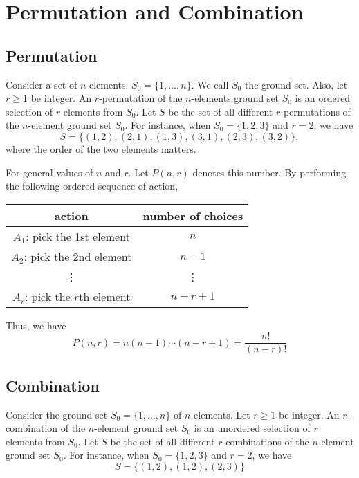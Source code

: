\newpage
\section{Permutation and Combination}
\subsection{Permutation}
\begin{eg}
    Consider a set of \(n\) elements: \(S_0 = \{1, \dots, n\}\). We call \(S_0\) the ground set. Also, let \(r \geq 1\) be integer. An \(r\)-permutation of the \(n\)-elements ground set \(S_0\) is an ordered selection of \(r\) elements from \(S_0\). Let \(S\) be the set of all different \(r\)-permutations of the \(n\)-element ground set \(S_0\). For instance, when \(S_0 = \{1, 2, 3\}\) and \(r = 2\), we have
    \[
        S = \{(1, 2), (2, 1), (1, 3), (3, 1), (2, 3), (3, 2)\},
    \]
    where the order of the two elements matters. 
\end{eg}

For general values of \(n\) and \(r\). Let \(P(n, r)\) denotes this number. By performing the following ordered sequence of action,
\begin{table}[H]
    \centering
    \begin{tabular}{c|c}
            action & number of choices  \\
        \midrule
            \(A_1\): pick the 1st element & \(n\)   \\
            \(A_2\): pick the 2nd element & \(n - 1\)   \\
            \vdots & \vdots  \\
            \(A_r\): pick the \(r\)th element & \(n - r + 1\)
    \end{tabular}
\end{table}
Thus, we have
\[
    P(n, r) = n(n - 1)\cdots(n - r + 1) = \dfrac{n!}{(n - r)!}
\]

\subsection{Combination}
\begin{eg}
    Consider the ground set \(S_0 = \{1, \dots, n\}\) of \(n\) elements. Let \(r \geq 1\) be integer. An \(r\)-combination of the \(n\)-element ground set \(S_0\) is an unordered selection of \(r\) elements from \(S_0\). Let \(S\) be the set of all different \(r\)-combinations of the \(n\)-element ground set \(S_0\). For instance, when \(S_0 = \{1, 2, 3\}\) and \(r = 2\), we have
    \[
        S = \{(1, 2), (1, 2), (2, 3)\}
    \]
\end{eg}

